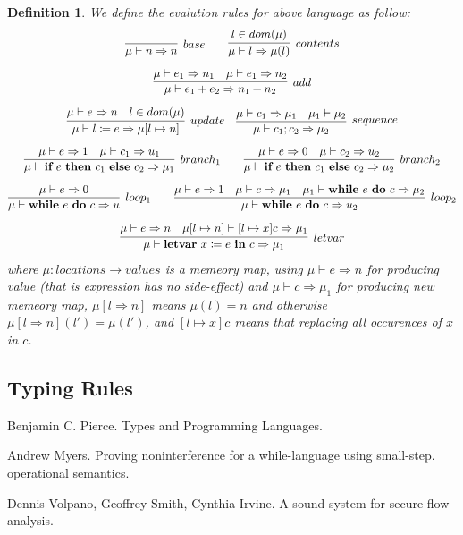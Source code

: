 \documentclass{article}
\newtheorem{definition}[theorem]{Definition}
\newcommand*{\xfunc}[4]{{#2}\colon{#3}{#1}{#4}}
\newcommand*{\func}[3]{\xfunc{\to}{#1}{#2}{#3}}
\newcommand{\ifelse}[3]{\ensuremath{\textbf{if}~#1~\textbf{then}~#2~\textbf{else}~#3}}
\newcommand{\newwhiledo}[2]{\ensuremath{\textbf{while}~#1~\textbf{do}~#2}}
\newcommand{\letvar}[2]{\ensuremath{\textbf{letvar}~#1~\textbf{in}~#2}}
\begin{document}
\begin{definition}
\rm We define the evalution rules for above language as follow:
\[
	\begin{gathered}
	\infer[base]{\mu \vdash n \Rightarrow n}{} \quad\quad \infer[contents]{\mu \vdash l \Rightarrow \mu(l)}{l \in dom(\mu)} \\[0.5em]
	\infer[add]{\mu \vdash e_1 + e_2 \Rightarrow n_1 + n_2}{\mu \vdash e_1 \Rightarrow n_1 & \mu \vdash e_1 \Rightarrow n_2} \\[0.5em]
	\infer[update]{\mu \vdash l \coloneqq e \Rightarrow \mu[l \mapsto n]}{\mu \vdash e \Rightarrow n & l \in dom(\mu)} \quad \infer[sequence]{\mu \vdash c_1;c_2 \Rightarrow \mu_2}{\mu \vdash c_1 \Rightarrow \mu_1 & \mu_1 \vdash \mu_2} \\[0.5em]
	\infer[branch_1]{\mu \vdash \ifelse{e}{c_1}{c_2} \Rightarrow \mu_1}{\mu \vdash e \Rightarrow 1 & \mu \vdash c_1 \Rightarrow u_1} \quad\quad \infer[branch_2]{\mu \vdash \ifelse{e}{c_1}{c_2} \Rightarrow \mu_2}{\mu \vdash e \Rightarrow 0 & \mu \vdash c_2 \Rightarrow u_2} \\[0.5em]
	\infer[loop_1]{\mu \vdash \newwhiledo{e}{c} \Rightarrow u}{\mu \vdash e \Rightarrow 0} \quad\quad \infer[loop_2]{\mu \vdash \newwhiledo{e}{c} \Rightarrow u_2}{\mu \vdash e \Rightarrow 1 & \mu \vdash c \Rightarrow \mu_1 & \mu_1 \vdash \newwhiledo{e}{c} \Rightarrow \mu_2}\\[0.5em]
	\infer[letvar]{\mu \vdash \letvar{x \coloneqq e}{c} \Rightarrow \mu_1}{\mu \vdash e \Rightarrow n & \mu[l \mapsto n] \vdash [l \mapsto x]c \Rightarrow \mu_1}
	\end{gathered}
\]
where $\func{\mu}{locations}{values}$ is a memeory map, using $\mu \vdash e \Rightarrow n$ for producing value (that is expression has no side-effect) and $\mu \vdash c \Rightarrow \mu_1$ for producing new memeory map, $\mu[l \Rightarrow n]$ means $\mu(l) = n$ and otherwise $\mu[l \Rightarrow n](l') = \mu(l')$, and $[l \mapsto x]c$ means that replacing all occurences of $x$ in $c$.
\end{definition}


\subsection{Typing Rules}


\begin{thebibliography}{9}
Benjamin C. Pierce. Types and Programming Languages.

Andrew Myers. Proving noninterference for a while-language using small-step. operational semantics.

Dennis Volpano, Geoffrey Smith, Cynthia Irvine. A sound system for secure flow analysis.
\end{thebibliography}
\end{document}
